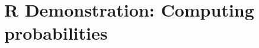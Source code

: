 \documentclass[slidestop,compress,mathserif]{beamer}
\begin{document}



\section{R Demonstration: Computing probabilities}



\end{document}
